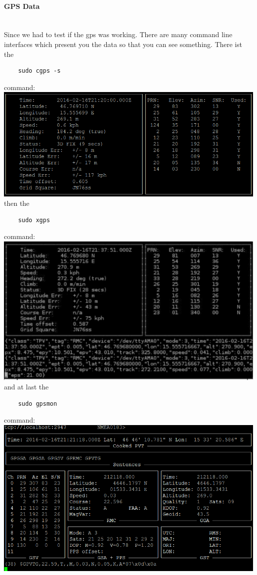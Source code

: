 \paragraph{GPS Data} \mbox{}\\
Since we had to test if the \gls{gps} was working. There are many command line interfaces which present you the data so that you can see something.\newline
There ist the 
\begin{verbatim}
	sudo cgps -s
\end{verbatim}
command:\newline
\includegraphics[scale=0.7]{bilder/scr1}
\newline
then the
\begin{verbatim}
	sudo xgps
\end{verbatim}
command:\newline
\includegraphics[scale=0.9]{bilder/scr2}
\newline
and at last the 
\begin{verbatim}
	sudo gpsmon
\end{verbatim}
command:\newline
\includegraphics[scale=0.7]{bilder/scr3}
